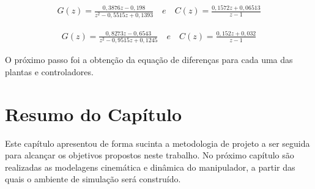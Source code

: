 \begin{equation}
  \begin{gathered}
    G(z) = \frac{0,3876z - 0,198}{z^2 - 0,5515z + 0,1393} \quad e \quad C(z) = \frac{0,1572z + 0,06513}{z - 1}
  \end{gathered}
  \label{eq:shoulder_discrete}
\end{equation}

\begin{equation}
  \begin{gathered}
   G(z) = \frac{0,8273z - 0,6543}{z^2 - 0,9515z + 0,1245} \quad e \quad C(z) = \frac{0,152z + 0,032}{z - 1}
  \end{gathered}
  \label{eq:forearm_discrete}
\end{equation}

O próximo passo foi a obtenção da equação de diferenças para cada uma das plantas e
controladores.

\section{Resumo do Capítulo}


Este capítulo apresentou de forma sucinta a metodologia de projeto a ser seguida para 
alcançar os objetivos propostos neste trabalho. No próximo capítulo são realizadas 
as modelagens cinemática e dinâmica do manipulador, a partir das quais o ambiente de 
simulação será construído.


\clearpage
